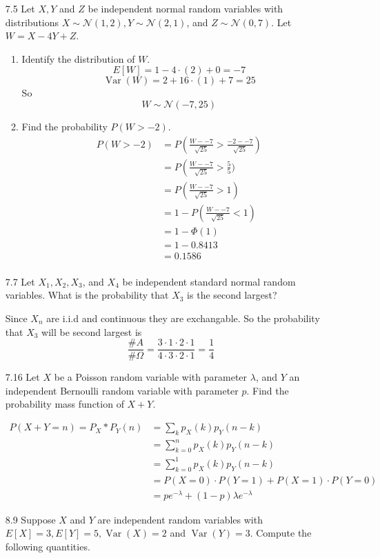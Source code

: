 \documentclass[10pt]{article}
\begin{document}
\begin{itemize}
\newpage
   \item[7.5] Let $X, Y$ and $Z$ be independent normal random variables with distributions $X \sim \mathcal{N}(1,2), Y \sim \mathcal{N}(2,1)$, and $Z \sim \mathcal{N}(0,7)$. Let $W=X-4 Y+Z$.
     \begin{enumerate}
       \item Identify the distribution of $W$.
          \[ E[W] = 1 - 4 \cdot (2) + 0 = -7 \]
          \[ \operatorname{Var}(W) = 2 + 16 \cdot (1) + 7 = 25 \]
          So
          \[ W \sim \mathcal{N}(-7,25)  \]

       \item Find the probability $P(W>-2)$.
          \begin{align*}
             P\left(W > -2\right) &= P\left(\frac{W- -7}{\sqrt{25}} > \frac{-2 - -7}{\sqrt{25}} \right)\\
             &= P\left(\frac{W- -7}{\sqrt{25}} > \frac{5}{5} )\\
             &= P\left(\frac{W- -7}{\sqrt{25}} > 1\right) \\
             &= 1 - P\left(\frac{W- -7}{\sqrt{25}} < 1\right) \\
             &= 1 - \Phi\left( 1\right) \\
             &= 1 - 0.8413 \\
             &= 0.1586 \\
          \end{align*}
     \end{enumerate}

\newpage
   \item[7.7] Let $X_{1}, X_{2}, X_{3}$, and $X_{4}$ be independent standard normal random variables. What is the probability that $X_{3}$ is the second largest?


      Since $X_n$ are i.i.d and continuous they are
      exchangable.  So the probability that $X_3$ will
      be second largest is
      \[ \frac{\#A}{\#\Omega} = \frac{3 \cdot 1 \cdot 2 \cdot 1}{4 \cdot 3 \cdot 2 \cdot 1} = \frac{1}{4}    \]
\newpage
   \item[7.16] Let $X$ be a Poisson random variable
      with parameter $\lambda$, and $Y$ an independent
      Bernoulli random variable with parameter $p$.
      Find the probability mass function of $X+Y$.

      \begin{align*}
         P(X+Y=n) = P_X * P_Y(n) &= \sum_{k} p_X(k)p_Y(n-k) \\
             &= \sum^{n}_{k=0} p_X(k)p_Y(n-k) \\
             &= \sum^{1}_{k=0} p_X(k)p_Y(n-k) \\
             &= P(X=0) \cdot P(Y=1)
                  + P(X=1) \cdot P(Y=0) \\
             &= p e^{-\lambda} + (1-p) \lambda e^{-\lambda}
      \end{align*}
\newpage
   \item[8.9] Suppose $X$ and $Y$ are independent
      random variables with $E[X]= 3, E[Y]=5,
      \operatorname{Var}(X)=2$ and
      $\operatorname{Var}(Y)=3$. Compute the following
      quantities.


\end{itemize}
\end{document}

